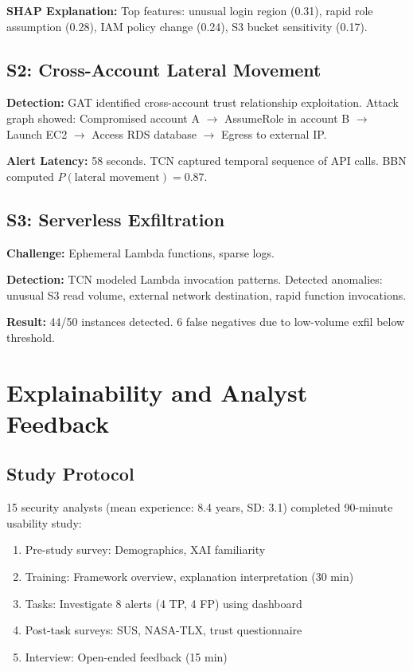\textbf{SHAP Explanation:} Top features: unusual login region (0.31), rapid role assumption (0.28), IAM policy change (0.24), S3 bucket sensitivity (0.17).

\subsection{S2: Cross-Account Lateral Movement}
\textbf{Detection:} GAT identified cross-account trust relationship exploitation. Attack graph showed: Compromised account A $\rightarrow$ AssumeRole in account B $\rightarrow$ Launch EC2 $\rightarrow$ Access RDS database $\rightarrow$ Egress to external IP.

\textbf{Alert Latency:} 58 seconds. TCN captured temporal sequence of API calls. BBN computed $P(\text{lateral movement}) = 0.87$.

\subsection{S3: Serverless Exfiltration}
\textbf{Challenge:} Ephemeral Lambda functions, sparse logs.

\textbf{Detection:} TCN modeled Lambda invocation patterns. Detected anomalies: unusual S3 read volume, external network destination, rapid function invocations.

\textbf{Result:} 44/50 instances detected. 6 false negatives due to low-volume exfil below threshold.

\section{Explainability and Analyst Feedback}\label{sec:eval-xai}
\subsection{Study Protocol}
15 security analysts (mean experience: 8.4 years, SD: 3.1) completed 90-minute usability study:
\begin{enumerate}
    \item Pre-study survey: Demographics, XAI familiarity
    \item Training: Framework overview, explanation interpretation (30 min)
    \item Tasks: Investigate 8 alerts (4 TP, 4 FP) using dashboard
    \item Post-task surveys: SUS, NASA-TLX, trust questionnaire
    \item Interview: Open-ended feedback (15 min)
\end{enumerate}

